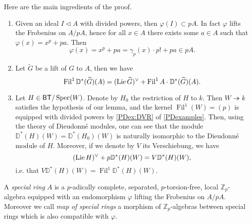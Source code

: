\begin{rem}[]\label{rem:A2Kisin}
	Here are the main ingredients of the proof.
\begin{enumerate}
	\item Given an ideal $I \triangleleft A$ with divided powers, then $\varphi(I) \subset pA$.
		In fact \(\varphi\) lifts the Frobenius on \(A/pA\),
		hence for all \(x \in A\) there exists some \(a \in A\)
		such that \(\varphi(x) = x^p + pa\).
		Then
		\begin{equation*}
			\varphi(x) = x^p + pa =
			\gamma_p(x) \cdot p! + pa \in pA
		.\end{equation*}

	\item Let $\widetilde{G}$ be a lift of $G$ to $A$, then we have
		\begin{equation*}
			\operatorname{Fil}^1\mathbb{D}^*(\widetilde{G})(A) =
			( \operatorname{Lie} \widetilde{G} )^\vee +
			\operatorname{Fil}^1A \cdot \mathbb{D}^*(\widetilde{G})(A)
		.\end{equation*}
		
	\item Let $H \in \mathsf{BT}/\operatorname{Spec}(W)$. Denote by $H_0$ the restriction
		of $H$ to $k$.
		Then $W \twoheadrightarrow k$ satisfies the hypothesis of our lemma,
		and the kernel $\operatorname{Fil}^1(W) = (p)$ is equipped with divided powers
		by \cref{PDex:DVR} of \cref{PDexamples}.
		Then, using the theory of Dieudonné modules, one can see that
		the module \(\mathbb{D}^*(H)(W) = \mathbb{D}^*(H_0)(W)\)
		is naturally isomorphic to the Dieudonné module
		of \(H\). Moreover, if we denote by \(V\)
		its Verschiebung, we have 
		\begin{equation*}
			( \operatorname{Lie} H)^\vee + p \mathbb{D}^*(H)(W) =
			V \mathbb{D}^{*}(H)(W)
		,\end{equation*}
		i.e. that
		$V \mathbb{D}^*(H)(W) = \operatorname{Fil}^1 \mathbb{D}^*(H)(W)$.
\end{enumerate}
\end{rem}


\begin{defn}
	A \emph{special ring} $A$ is a $p$-adically complete, separated, $p$-torsion-free,
	local $\mathbb{Z}_{p}$-algebra equipped with an endomorphism $\varphi$
	lifting the Frobenius on $A/pA$.
	Moreover we call \emph{map of special rings} a morphism
	of $\mathbb{Z}_{p}$-algebras between special rings 
	which is also compatible with $\varphi$.
\end{defn}


